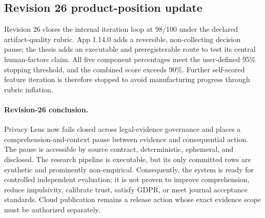 

\subsection{Revision 26 product-position update}

Revision 26 closes the internal iteration loop at 98/100 under the declared artifact-quality rubric. App 1.14.0 adds a reversible, non-collecting decision pause; the thesis adds an executable and preregisterable route to test its central human-factors claim. All five component percentages meet the user-defined 95\% stopping threshold, and the combined score exceeds 90\%. Further self-scored feature iteration is therefore stopped to avoid manufacturing progress through rubric inflation.

\paragraph{Revision-26 conclusion.} Privacy Lens now fails closed across legal-evidence governance and places a comprehension-and-context pause between evidence and consequential action. The pause is accessible by source contract, deterministic, ephemeral, and disclosed. The research pipeline is executable, but its only committed rows are synthetic and prominently non-empirical. Consequently, the system is ready for controlled independent evaluation; it is not proven to improve comprehension, reduce impulsivity, calibrate trust, satisfy GDPR, or meet journal acceptance standards. Cloud publication remains a release action whose exact evidence scope must be authorized separately.
